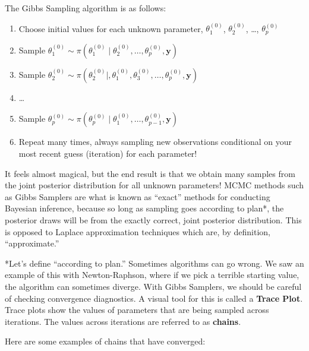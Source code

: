 \documentclass[
  letterpaper,
  DIV=11,
  numbers=noendperiod]{scrreprt}
\begin{document}
The Gibbs Sampling algorithm is as follows:

\begin{enumerate}
\def\labelenumi{\arabic{enumi}.}
\item
  Choose initial values for each unknown parameter, \(\theta_1^{(0)}\),
  \(\theta_2^{(0)}\), \ldots, \(\theta_p^{(0)}\)
\item
  Sample
  \(\theta_{1}^{(0)} \sim \pi(\theta_{1}^{(0)} \mid \theta_{2}^{(0)}, \dots, \theta_{p}^{(0)},\textbf{y})\)
\item
  Sample
  \(\theta_{2}^{(0)} \sim \pi(\theta_{2}^{(0)} \mid, \theta_{1}^{(0)}, \theta_{3}^{(0)}, \dots, \theta_{p}^{(0)},\textbf{y})\)
\item
  \ldots{}
\item
  Sample
  \(\theta_{p}^{(0)} \sim \pi(\theta_{p}^{(0)} \mid \theta_{1}^{(0)}, \dots, \theta_{p-1}^{(0)},\textbf{y})\)
\item
  Repeat many times, always sampling new observations conditional on
  your most recent guess (iteration) for each parameter!
\end{enumerate}

It feels almost magical, but the end result is that we obtain many
samples from the joint posterior distribution for all unknown
parameters! MCMC methods such as Gibbs Samplers are what is known as
``exact'' methods for conducting Bayesian inference, because so long as
sampling goes according to plan*, the posterior draws will be from the
exactly correct, joint posterior distribution. This is opposed to
Laplace approximation techniques which are, by definition,
``approximate.''

*Let's define ``according to plan.'' Sometimes algorithms can go wrong.
We saw an example of this with Newton-Raphson, where if we pick a
terrible starting value, the algorithm can sometimes diverge. With Gibbs
Samplers, we should be careful of checking convergence diagnostics. A
visual tool for this is called a \textbf{Trace Plot}. Trace plots show
the values of parameters that are being sampled across iterations. The
values across iterations are referred to as \textbf{chains}.

Here are some examples of chains that have converged:
\end{document}
